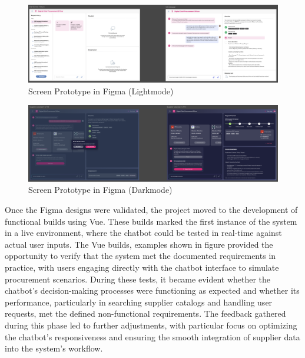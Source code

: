 \begin{figure}[H]
    \centering
    \caption[Screen Prototype in Figma (Lightmode)]{Screen Prototype in Figma (Lightmode) \footnotemark}
    \label{fig:ScreenPrototypeFigmaLM}
    \includegraphics[width=1\textwidth]{abbildungen/RE/Figma/Figma_Screens-Lightmode}
\end{figure}

\begin{figure}[H]
    \centering
    \caption[Screen Prototype in Figma (Darkmode)]{Screen Prototype in Figma (Darkmode) \footnotemark}
    \label{fig:ScreenPrototypeFigmaDM}
    \includegraphics[width=1\textwidth]{abbildungen/RE/Figma/Figma_Screens-Darkmode}
\end{figure}

Once the Figma designs were validated, the project moved to the development of functional builds using Vue. These builds
marked the first instance of the system in a live environment, where the chatbot could be tested in real-time against
actual user inputs. The Vue builds, examples shown in figure
provided the opportunity to verify that the system met the documented requirements in
practice, with users engaging directly with the chatbot interface to simulate procurement scenarios. During these tests,
it became evident whether the chatbot’s decision-making processes were functioning as expected and whether its
performance, particularly in searching supplier catalogs and handling user requests, met the defined non-functional
requirements. The feedback gathered during this phase led to further adjustments, with particular focus on optimizing
the chatbot’s responsiveness and ensuring the smooth integration of supplier data into the system’s workflow.

